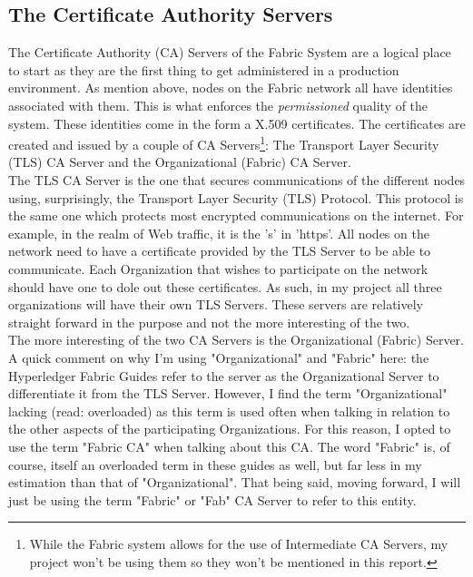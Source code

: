 	\subsection{The Certificate Authority Servers}
		\hspace{10mm}The Certificate Authority (CA) Servers of the Fabric System are a logical place to start as they are the first thing to get administered in a production environment. As mention above, nodes on the Fabric network all have identities associated with them. This is what enforces the \textit{permissioned} quality of the system. These identities come in the form a X.509 certificates. The certificates are created and issued by a couple of CA Servers\footnote{While the Fabric system allows for the use of Intermediate CA Servers, my project won't be using them so they won't be mentioned in this report.}: The Transport Layer Security (TLS) CA Server and the Organizational (Fabric) CA Server.\\
		
		\hspace{10mm}The TLS CA Server is the one that secures communications of the different nodes using, surprisingly, the Transport Layer Security (TLS) Protocol. This protocol is the same one which protects most encrypted communications on the internet. For example, in the realm of Web traffic, it is the 's' in 'https'. All nodes on the network need to have a certificate provided by the TLS Server to be able to communicate. Each Organization that wishes to participate on the network should have one to dole out these certificates. As such, in my project all three organizations will have their own TLS Servers. These servers are relatively straight forward in the purpose and not the more interesting of the two.\\
		
		\hspace{10mm}The more interesting of the two CA Servers is the Organizational (Fabric) Server. A quick comment on why I'm using "Organizational" and "Fabric" here: the Hyperledger Fabric Guides refer to the server as the Organizational Server to differentiate it from the TLS Server. However, I find the term "Organizational" lacking (read: overloaded) as this term is used often when talking in relation to the other aspects of the participating Organizations. For this reason, I opted to use the term "Fabric CA" when talking about this CA. The word "Fabric" is, of course, itself an overloaded term in these guides as well, but far less in my estimation than that of "Organizational". That being said, moving forward, I will just be using the term "Fabric" or "Fab" CA Server to refer to this entity.\\
		
